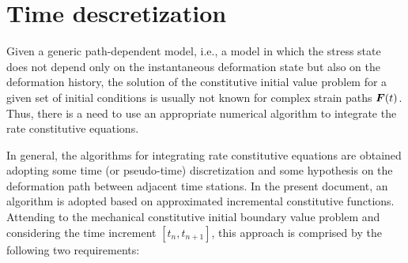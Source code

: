 \section{Time descretization} \label{sec:time_discretization}

Given a generic path-dependent model, i.e., a model in which the stress state does not depend only on the instantaneous deformation state but also on the deformation history, the solution of the constitutive initial value problem for a given set of initial conditions is usually not known for complex strain paths $\bm{F}(t)$.
Thus, there is a need to use an appropriate numerical algorithm to integrate the rate constitutive equations.

In general, the algorithms for integrating rate constitutive equations are obtained adopting some time (or pseudo-time) discretization and some hypothesis on the deformation path between adjacent time stations.
In the present document, an algorithm is adopted based on approximated incremental constitutive functions.
Attending to the mechanical constitutive initial boundary value problem and considering the time increment $[t_n, t_{n+1}]$, this approach is comprised by the following two requirements:

